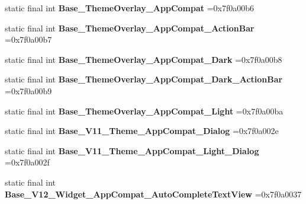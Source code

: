 \begin{DoxyCompactItemize}
\mbox{\label{classproject4_1_1xaria_1_1R_1_1style_affda4c71506894f3cdf4c15bafec9d8a}} 
static final int {\bfseries Base\+\_\+\+Theme\+Overlay\+\_\+\+App\+Compat} =0x7f0a00b6
\item 
\mbox{\label{classproject4_1_1xaria_1_1R_1_1style_aabbea09f1897e1550b097fadd9fa1f49}} 
static final int {\bfseries Base\+\_\+\+Theme\+Overlay\+\_\+\+App\+Compat\+\_\+\+Action\+Bar} =0x7f0a00b7
\item 
\mbox{\label{classproject4_1_1xaria_1_1R_1_1style_a397249f9af24d6406860c6f44a07061e}} 
static final int {\bfseries Base\+\_\+\+Theme\+Overlay\+\_\+\+App\+Compat\+\_\+\+Dark} =0x7f0a00b8
\item 
\mbox{\label{classproject4_1_1xaria_1_1R_1_1style_af304957f3936fdfa41be57e96565cb81}} 
static final int {\bfseries Base\+\_\+\+Theme\+Overlay\+\_\+\+App\+Compat\+\_\+\+Dark\+\_\+\+Action\+Bar} =0x7f0a00b9
\item 
\mbox{\label{classproject4_1_1xaria_1_1R_1_1style_a8def453a56c7c0c79fcd0a564d6f6184}} 
static final int {\bfseries Base\+\_\+\+Theme\+Overlay\+\_\+\+App\+Compat\+\_\+\+Light} =0x7f0a00ba
\item 
\mbox{\label{classproject4_1_1xaria_1_1R_1_1style_af27ab89bed7c65b6c5bc562eb4178dab}} 
static final int {\bfseries Base\+\_\+\+V11\+\_\+\+Theme\+\_\+\+App\+Compat\+\_\+\+Dialog} =0x7f0a002e
\item 
\mbox{\label{classproject4_1_1xaria_1_1R_1_1style_ab9703c132c46215d5b510cfca7830654}} 
static final int {\bfseries Base\+\_\+\+V11\+\_\+\+Theme\+\_\+\+App\+Compat\+\_\+\+Light\+\_\+\+Dialog} =0x7f0a002f
\item 
\mbox{\label{classproject4_1_1xaria_1_1R_1_1style_a3193516e1fd479b09929dd9c7a9422b7}} 
static final int {\bfseries Base\+\_\+\+V12\+\_\+\+Widget\+\_\+\+App\+Compat\+\_\+\+Auto\+Complete\+Text\+View} =0x7f0a0037
\item 
\mbox{\label{classproject4_1_1xaria_1_1R_1_1style_ac475bf6ff38e29c2cb66a7bc01c168fc}} 

\end{DoxyCompactItemize}
